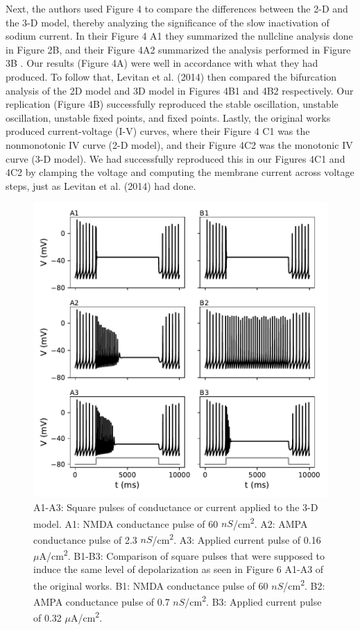 Next, the authors used Figure 4 to compare the differences between the 2-D and the 3-D model, thereby analyzing the significance of the slow inactivation of sodium current. In their Figure 4 A1 they summarized the nullcline analysis done in Figure 2B, and their Figure 4A2 summarized the analysis performed in Figure 3B . Our results (Figure 4A) were well in accordance with what they had produced. To follow that, Levitan et al. (2014) then compared the bifurcation analysis of the 2D model and 3D model in Figures 4B1 and 4B2 respectively. Our replication (Figure 4B) successfully reproduced the stable oscillation, unstable oscillation, unstable fixed points, and fixed points. Lastly, the original works produced current-voltage (I-V) curves, where their Figure 4 C1 was the nonmonotonic IV curve (2-D model), and their Figure 4C2 was the monotonic IV curve (3-D model). We had successfully reproduced this in our Figures 4C1 and 4C2 by clamping the voltage and computing the membrane current across voltage steps, just as Levitan et al. (2014) had done.\\ 


\begin{figure}
	\centering
	\includegraphics[scale=0.7]{../figures/figure_6.pdf}
	\caption{A1-A3: Square pulses of conductance or current applied to the 3-D model. A1: NMDA conductance pulse of 60 $nS$/cm\textsuperscript{2}. A2: AMPA conductance pulse of 2.3 $nS$/cm\textsuperscript{2}. A3: Applied current pulse of 0.16 $\mu$A/cm\textsuperscript{2}. B1-B3: Comparison of square pulses that were supposed to induce the same level of depolarization as seen in Figure 6 A1-A3 of the original works. B1: NMDA conductance pulse of 60 $nS$/cm\textsuperscript{2}. B2: AMPA conductance pulse of 0.7 $nS$/cm\textsuperscript{2}. B3: Applied current pulse of 0.32 $\mu$A/cm\textsuperscript{2}. }
	\label{fig:6}
\end{figure}

